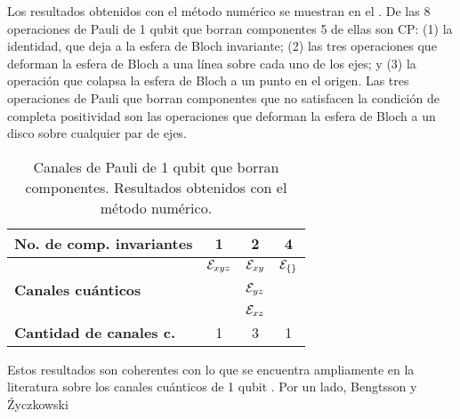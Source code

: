 Los resultados obtenidos con el método numérico se muestran
en el . De las 8 operaciones de Pauli de 1 qubit que 
borran componentes 5 de ellas son CP: (1) la identidad, 
que deja a la esfera de Bloch invariante; (2) las tres operaciones 
que deforman la esfera de Bloch a una línea sobre cada uno 
de los ejes; y (3) la operación que colapsa la esfera de Bloch 
a un punto en el origen. Las tres operaciones de Pauli que borran 
componentes que no satisfacen la condición de completa positividad
son las operaciones que deforman la esfera de Bloch a un 
disco sobre cualquier par de ejes.
\begin{table}
\centering
\begin{tabular}{l|c|c|c}
\textbf{No. de comp. invariantes} & \textbf{1} & \textbf{2} &  \textbf{4}\\
\hline 
 & $\mathcal{E}_{xyz}$ & $\mathcal{E}_{xy}$ & $\mathcal{E}_{\{\}}$ \\ 
\textbf{Canales cuánticos} &  & $\mathcal{E}_{yz}$ &  \\ 
 & & $\mathcal{E}_{xz}$ &  \\ 
\hline
\textbf{Cantidad de canales c.} & 1 & 3 & 1 \\
\end{tabular} 
\caption{Canales de Pauli de 1 qubit que borran componentes. Resultados
obtenidos con el método numérico.}
\label{c:resultados-1q}
\end{table}

Estos resultados son coherentes con lo que se encuentra 
ampliamente en la literatura sobre los canales cuánticos 
de 1 qubit \cite{nielsen_chuang_2011}
\cite{bengtsson_zyczkowski_2017}. Por un lado, Bengtsson y 
Źyczkowski 




